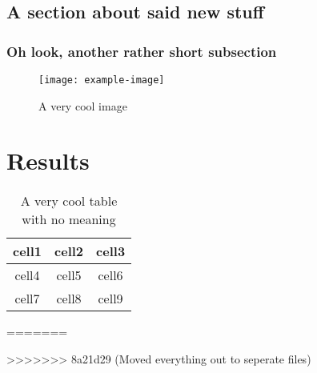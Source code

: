\documentclass[letterpaper, openany, 12pt, oneside]{uithesis}
\begin{document}
\section{A section about said new stuff}
\lipsum[41-45]

\subsection{Oh look, another rather short subsection}
\begin{figure}[!htb]
	\centering
	\texttt{[image: example-image]}
	\caption{A very cool image}%
	\label{fig:four}
\end{figure}
\lipsum[46-47]

\chapter{Results}
\begin{table}
	\centering
	\label{table:one}
	\begin{tabular}{ c c c }
		cell1 & cell2 & cell3 \\ \hline
		cell4 & cell5 & cell6 \\ \hline
		cell7 & cell8 & cell9
	\end{tabular}
	\caption{A very cool table with no meaning}
\end{table}
\lipsum[48-61]
=======


>>>>>>> 8a21d29 (Moved everything out to seperate files)

\backmatter

\printbibliography
\end{document}
